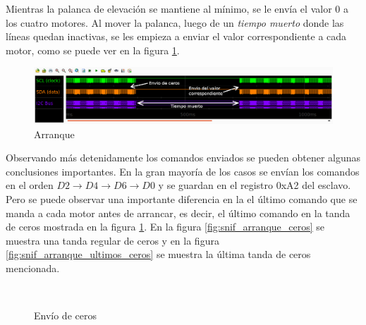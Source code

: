 \documentclass[main]{subfiles}
\begin{document}
Mientras la palanca de elevaci\'on se mantiene al m\'inimo, se le env\'ia el valor 0 a los cuatro motores. Al mover la palanca, luego de un \emph{tiempo muerto} donde las l\'ineas quedan inactivas, se les empieza a enviar el valor correspondiente a cada motor, como se puede ver en la figura \ref{fig:snif_arranque_lejos}.

\begin{figure}[h!]
	\centering
	\includegraphics[width=1\textwidth]{./pics_sniffer/snif_arranque_lejos.png}
	\caption{Arranque}
	\label{fig:snif_arranque_lejos}
\end{figure}

Observando m\'as detenidamente los comandos enviados se pueden obtener algunas conclusiones importantes. En la gran mayor\'ia de los casos se env\'ian los comandos en el orden $D2\rightarrow D4\rightarrow D6\rightarrow D0$ y se guardan en el registro 0xA2 del esclavo. Pero se puede observar una importante diferencia en la el \'ultimo comando que se manda a cada motor antes de arrancar, es decir, el \'ultimo comando en la tanda de ceros mostrada en la figura \ref{fig:snif_arranque_lejos}. En la figura \ref{fig:snif_arranque_ceros} se muestra una tanda regular de ceros y en la figura \ref{fig:snif_arranque_ultimos_ceros} se muestra la \'ultima tanda de ceros mencionada.\\

\begin{figure} [h!]
\centering
   \\
  \caption{Env\'io de ceros}
  \label{fig:snif_arranque_cerca}
\end{figure}
\end{document}
